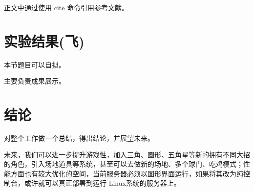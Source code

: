 \documentclass[conference]{IEEEtran}
\begin{document}
正文中通过使用 cite 命令引用参考文献。


\section{实验结果(飞)}
本节题目可以自拟。

主要负责成果展示。


\section{结论}
对整个工作做一个总结，得出结论，并展望未来。

未来，我们可以进一步提升游戏性，加入三角、圆形、五角星等新的拥有不同大招的角色，引入场地道具等系统，甚至可以去做新的场地、多个球门、吃鸡模式；性能方面也有较大优化的空间，当前服务器必须以图形界面运行，如果将其改为纯控制台，或许就可以真正部署到运行 Linux系统的服务器上。




\end{document}

